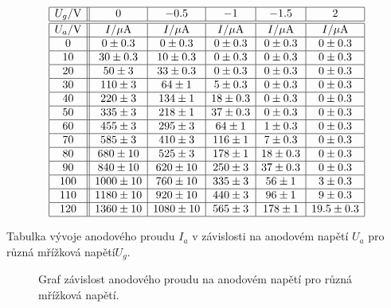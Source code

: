 \documentclass[a4paper,12pt]{article}
\begin{document}
\begin{table}
$$
\begin{array}{|c||c|c|c|c|c|}
\hline
U_g/\mbox{V}    &   0   &   -0.5    &   -1  &   -1.5    &   2   \\ \hline    
\hline  
U_a/\mbox{V}    &   I/\mu\mbox{A}&   I/\mu\mbox{A}  &   I/\mu\mbox{A} &   I/\mu\mbox{A} &  I/\mu\mbox{A} \\ \hline
0   &   0 \pm 0.3       &   0 \pm 0.3      &   0 \pm 0.3       &   0 \pm 0.3   &   0 \pm 0.3   \\  \hline
10  &   30 \pm 0.3  &   10\pm 0.3   &   0 \pm  0.3      &   0 \pm  0.3  &   0 \pm  0.3  \\ \hline
20  &   50 \pm 3 &   33\pm  0.3   &   0 \pm  0.3      &   0 \pm  0.3  &   0\pm  0.3   \\ \hline
30  &   110 \pm 3   &   64 \pm 1  &   5\pm  0.3   &   0 \pm  0.3  &   0 \pm  0.3  \\ \hline
40  &   220 \pm 3   &   134 \pm 1  &   18\pm  0.3   &   0 \pm  0.3  &   0 \pm  0.3  \\ \hline
50  &   335 \pm 3   &   218 \pm 1  &   37\pm  0.3   &   0 \pm  0.3  &   0 \pm  0.3  \\ \hline
60  &   455 \pm 3   &   295 \pm 3  &   64 \pm 1  &   1\pm  0.3   &   0 \pm  0.3  \\ \hline
70  &   585 \pm 3   &   410 \pm 3   &   116 \pm 1  &   7\pm  0.3   &   0 \pm  0.3  \\ \hline
80  &   680 \pm 10    &   525 \pm 3  &   178 \pm 1  &   18\pm  0.3   &   0 \pm  0.3  \\ \hline
90  &   840 \pm 10    &   620 \pm 10   &   250 \pm 3   &   37\pm  0.3   &   0  \pm  0.3 \\ \hline
100 &   1000 \pm 10    &   760 \pm 10   &   335 \pm 3  &   56 \pm 1  &   3\pm  0.3   \\ \hline
110 &   1180 \pm 10    &   920 \pm 10   &   440 \pm 3   &   96 \pm 1  &   9\pm  0.3   \\ \hline
120 &   1360 \pm 10    &   1080 \pm 10   &   565 \pm 3  &   178 \pm 1  &   19.5\pm  0.3   \\ \hline
\end{array}
$$
\caption{Tabulka vývoje anodového proudu $I_a$ v závislosti na anodovém napětí $U_a$ pro různá mřížková napětí$U_g$.}
\label{Ia}
\end{table}

\begin{figure}

\caption{Graf závislost anodového proudu na anodovém napětí pro různá mřížková napětí.}
\label{g1}
\end{figure}
\end{document}
